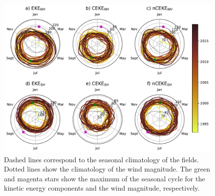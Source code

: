 \documentclass[draft]{agujournal2019}
\begin{document}
	\begin{figure}
	    \centering
	    \includegraphics[width=1\textwidth]{figures/All_polar_plots.pdf}
	    \caption{Dashed lines correspond to the seasonal climatology of the fields. Dotted lines show the climatology of the wind magnitude. The green and magenta stars show the maximum of the seasonal cycle for the kinetic energy components and the wind magnitude, respectively. }
	    \label{fig:my_label}
	\end{figure}


\end{document}
